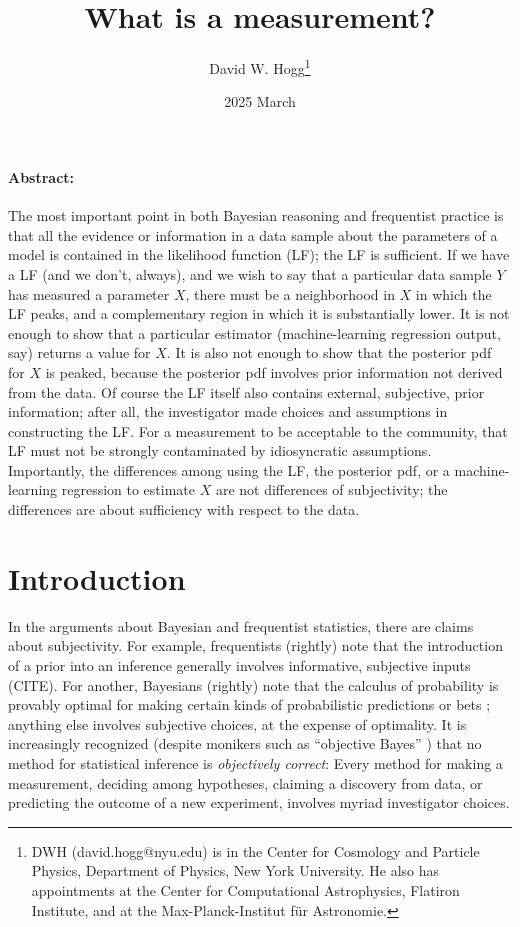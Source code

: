 \documentclass{article}
\title{\bfseries
What is a measurement?}
\author{David W. Hogg\footnote{%
DWH (david.hogg@nyu.edu) is in the Center for Cosmology and Particle Physics, Department of Physics, New York University.
He also has appointments at the Center for Computational Astrophysics, Flatiron Institute, and at the Max-Planck-Institut f\"ur Astronomie.}}
\date{2025 March}
\begin{document}
\maketitle\thispagestyle{empty}

\paragraph{Abstract:}
The most important point in both Bayesian reasoning and frequentist practice is that all the evidence or information in a data sample about the parameters of a model is contained in the likelihood function (LF); the LF is sufficient.
If we have a LF (and we don't, always), and we wish to say that a particular data sample $Y$ has measured a parameter $X$, there must be a neighborhood in $X$ in which the LF peaks, and a complementary region in which it is substantially lower.
It is not enough to show that a particular estimator (machine-learning regression output, say) returns a value for $X$.
It is also not enough to show that the posterior pdf for $X$ is peaked, because the posterior pdf involves prior information not derived from the data.
Of course the LF itself also contains external, subjective, prior information; after all, the investigator made choices and assumptions in constructing the LF.
For a measurement to be acceptable to the community, that LF must not be strongly contaminated by idiosyncratic assumptions.
Importantly, the differences among using the LF, the posterior pdf, or a machine-learning regression to estimate $X$ are not differences of subjectivity; the differences are about sufficiency with respect to the data.

\section{Introduction}\label{sec:intro}
In the arguments about Bayesian and frequentist statistics, there are claims about subjectivity.
For example, frequentists (rightly) note that the introduction of a prior into an inference generally involves informative, subjective inputs (CITE).
For another, Bayesians (rightly) note that the calculus of probability is provably optimal for making certain kinds of probabilistic predictions or bets \cite{jaynes}; anything else involves subjective choices, at the expense of optimality.
It is increasingly recognized (despite monikers such as ``objective Bayes'' \cite{objective}) that no method for statistical inference is \emph{objectively correct}:
Every method for making a measurement, deciding among hypotheses, claiming a discovery from data, or predicting the outcome of a new experiment, involves myriad investigator choices.
\end{document}
